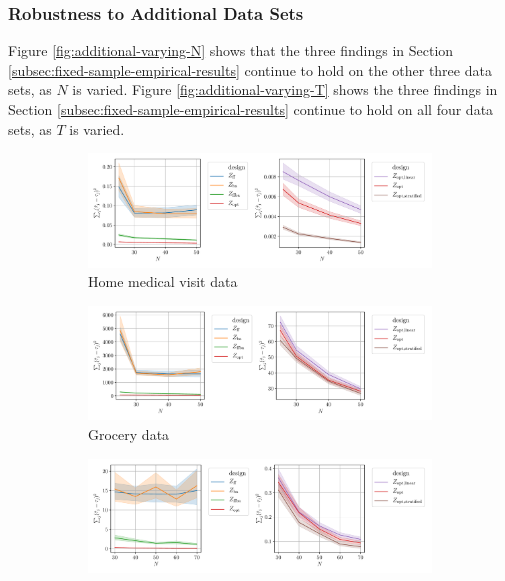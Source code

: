 \subsubsection{Robustness to Additional Data Sets}\label{subsubsec:robustness-additional-data-set}
Figure \ref{fig:additional-varying-N} shows that the three findings in Section \ref{subsec:fixed-sample-empirical-results} continue to hold on the other three data sets, as $N$ is varied. Figure \ref{fig:additional-varying-T} shows the three findings in Section \ref{subsec:fixed-sample-empirical-results} continue to hold on all four data sets, as $T$ is varied. 



\begin{figure}[H]
	\centering
	\begin{subfigure}{1\textwidth}
		\centering
		\includegraphics[width=0.8\linewidth]{plots/empirical/medical/medical_T_10_varying_N_lag_2_agg.pdf}
		\caption{Home medical visit data}
	\end{subfigure}
	\begin{subfigure}{1\textwidth}
		\centering
		\includegraphics[width=0.8\linewidth]{plots/empirical/grocery/grocery_T_20_varying_N_lag_2_agg.pdf}
		\caption{Grocery data}
	\end{subfigure}
	\begin{subfigure}{1\textwidth}
		\centering
		\includegraphics[width=0.8\linewidth]{plots/empirical/loan/loan_T_20_varying_N_lag_2_agg.pdf}

\end{subfigure}
\end{figure}
